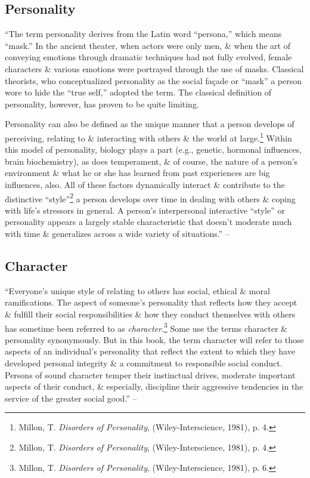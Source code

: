 \documentclass{article}
\numberwithin{equation}{section}
\begin{document}
\subsection{Personality}
``The term personality derives from the Latin word ``persona,'' which means ``mask.'' In the ancient theater, when actors were only men, \& when the art of conveying emotions through dramatic techniques had not fully evolved, female characters \& various emotions were portrayed through the use of masks. Classical theorists, who conceptualized personality as the social fa\c{c}ade or ``mask'' a person wore to hide the ``true self,'' adopted the term. The classical definition of personality, however, has proven to be quite limiting.

Personality can also be defined as the unique manner that a person develops of perceiving, relating to \& interacting with others \& the world at large.\footnote{Millon, T. \textit{Disorders of Personality}, (Wiley-Interscience, 1981), p. 4.} Within this model of personality, biology plays a part (e.g., genetic, hormonal influences, brain biochemistry), as does temperament, \& of course, the nature of a person's environment \& what he or she has learned from past experiences are big influences, also. All of these factors dynamically interact \& contribute to the distinctive ``style''\footnote{Millon, T. \textit{Disorders of Personality}, (Wiley-Interscience, 1981), p. 4.} a person develops over time in dealing with others \& coping with life's stressors in general. A person's interpersonal interactive ``style'' or personality appears a largely stable characteristic that doesn't moderate much with time \& generalizes across a wide variety of situations.'' -- \cite[pp. 27--28]{Simon2010}

\subsection{Character}
``Everyone's unique style of relating to others has social, ethical \& moral ramifications. The aspect of someone's personality that reflects how they accept \& fulfill their social responsibilities \& how they conduct themselves with others has sometime been referred to as \textit{character}.\footnote{Millon, T. \textit{Disorders of Personality}, (Wiley-Interscience, 1981), p. 6.} Some use the terms character \& personality synonymously. But in this book, the term character will refer to those aspects of an individual's personality that reflect the extent to which they have developed personal integrity \& a commitment to responsible social conduct. Persons of sound character temper their instinctual drives, moderate important aspects of their conduct, \& especially, discipline their aggressive tendencies in the service of the greater social good.'' -- \cite[p. 28]{Simon2010}
\end{document}
